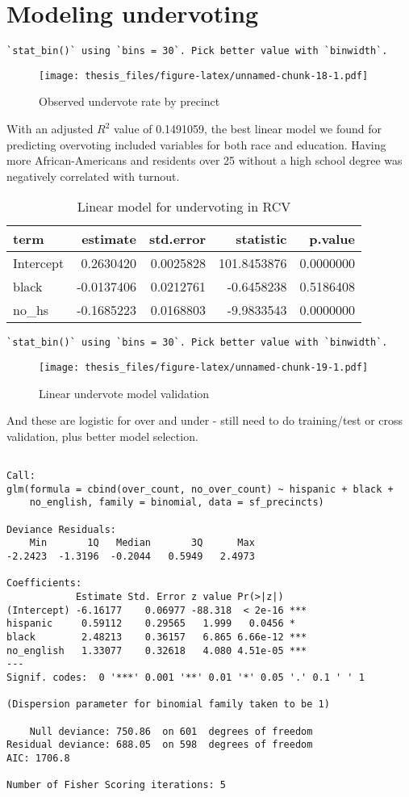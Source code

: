 \documentclass[12pt,twoside]{reedthesis}
\theoremstyle{definition}
\theoremstyle{definition}
\theoremstyle{definition}
\theoremstyle{remark}
\begin{document}
\hypertarget{modeling-undervoting}{%
\section{Modeling undervoting}\label{modeling-undervoting}}
\begin{verbatim}
`stat_bin()` using `bins = 30`. Pick better value with `binwidth`.
\end{verbatim}
\begin{figure}
\centering
\texttt{[image: thesis\_files/figure-latex/unnamed-chunk-18-1.pdf]}
\caption{\label{fig:unnamed-chunk-18}Observed undervote rate by precinct}
\end{figure}
With an adjusted \(R^2\) value of 0.1491059, the best linear model we
found for predicting overvoting included variables for both race and
education. Having more African-Americans and residents over 25 without a
high school degree was negatively correlated with turnout.
\begin{longtable}[t]{lrrrr}
\caption[Linear undervote model]{\label{tab:unnamed-chunk-19}Linear model for undervoting in RCV}\\
\toprule
term & estimate & std.error & statistic & p.value\\
\midrule
Intercept & 0.2630420 & 0.0025828 & 101.8453876 & 0.0000000\\
black & -0.0137406 & 0.0212761 & -0.6458238 & 0.5186408\\
no\_hs & -0.1685223 & 0.0168803 & -9.9833543 & 0.0000000\\
\bottomrule
\end{longtable}
\begin{verbatim}
`stat_bin()` using `bins = 30`. Pick better value with `binwidth`.
\end{verbatim}
\begin{figure}
\centering
\texttt{[image: thesis\_files/figure-latex/unnamed-chunk-19-1.pdf]}
\caption{\label{fig:unnamed-chunk-19}Linear undervote model validation}
\end{figure}
And these are logistic for over and under - still need to do
training/test or cross validation, plus better model selection.
\begin{verbatim}

Call:
glm(formula = cbind(over_count, no_over_count) ~ hispanic + black + 
    no_english, family = binomial, data = sf_precincts)

Deviance Residuals: 
    Min       1Q   Median       3Q      Max  
-2.2423  -1.3196  -0.2044   0.5949   2.4973  

Coefficients:
            Estimate Std. Error z value Pr(>|z|)    
(Intercept) -6.16177    0.06977 -88.318  < 2e-16 ***
hispanic     0.59112    0.29565   1.999   0.0456 *  
black        2.48213    0.36157   6.865 6.66e-12 ***
no_english   1.33077    0.32618   4.080 4.51e-05 ***
---
Signif. codes:  0 '***' 0.001 '**' 0.01 '*' 0.05 '.' 0.1 ' ' 1

(Dispersion parameter for binomial family taken to be 1)

    Null deviance: 750.86  on 601  degrees of freedom
Residual deviance: 688.05  on 598  degrees of freedom
AIC: 1706.8

Number of Fisher Scoring iterations: 5
\end{verbatim}
\end{document}
